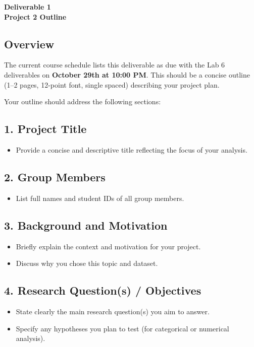 \documentclass[12pt]{article}
\begin{document}
\begin{center}
\textbf{\Large Deliverable 1 \\ Project 2 Outline} 
\end{center}

\subsection*{Overview}

The current course schedule lists this deliverable as due with the Lab 6 deliverables on \textbf{October 29th at 10:00 PM}.
This should be a concise outline (1--2 pages, 12-point font, single spaced) describing your project plan.

Your outline should address the following sections:

\subsection*{1. Project Title}
\begin{itemize}
    \item Provide a concise and descriptive title reflecting the focus of your analysis.
\end{itemize}

\subsection*{2. Group Members}
\begin{itemize}
    \item List full names and student IDs of all group members.
\end{itemize}

\subsection*{3. Background and Motivation}
\begin{itemize}
    \item Briefly explain the context and motivation for your project.
    \item Discuss why you chose this topic and dataset.
\end{itemize}

\subsection*{4. Research Question(s) / Objectives}
\begin{itemize}
    \item State clearly the main research question(s) you aim to answer.
    \item Specify any hypotheses you plan to test (for categorical or numerical analysis).
\end{itemize}
\end{document}
